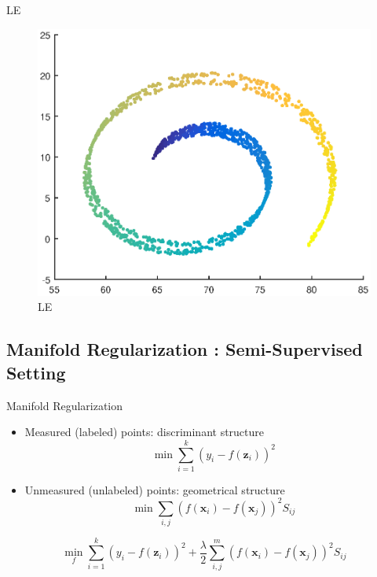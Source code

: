 \documentclass{beamer}
\newcommand{\bol}[1]{\textbf{#1}}
\begin{document}
\begin{darkframes}
   
   \begin{frame}{LE}
   \begin{figure}
   \centering
   \includegraphics[scale=0.5]{./figs/le.eps}
   \caption{LE}
   \end{figure}
   \end{frame}
   
   
   \subsection{Manifold Regularization : Semi-Supervised Setting}
   \begin{frame}{Manifold Regularization}
   \begin{itemize}
   	\item \alert{Measured (labeled)} points: discriminant structure\\
   	\begin{displaymath}
   		\min\sum_{i = 1}^k\left(y_i - f(\bol{z}_i)\right)^2
   	\end{displaymath}
	\item \alert{Unmeasured (unlabeled)} points: geometrical structure\\
	\begin{displaymath}
		\min\sum_{i,j}\left(f(\bol{x}_i) - f(\bol{x}_j)\right)^2S_{ij}
	\end{displaymath}
   \end{itemize}
   \begin{displaymath}
   		\min_f\sum_{i = 1}^k\left(y_i - f(\bol{z}_i)\right)^2 + \frac{\lambda}{2}\sum_{i,j}^m\left(f(\bol{x}_i) - f(\bol{x}_j)\right)^2S_{ij}
   \end{displaymath}
   \end{frame}
   

\end{darkframes}
\end{document}
